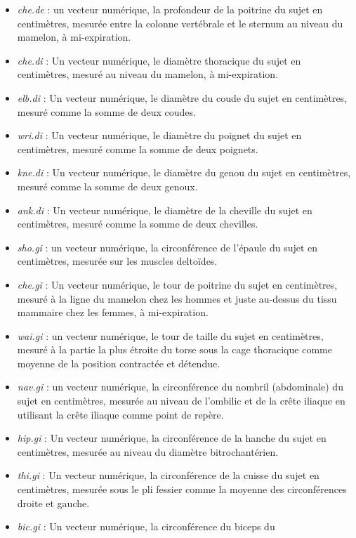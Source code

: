 \documentclass[
]{article}
\providecommand{\tightlist}{%
  \setlength{\itemsep}{0pt}\setlength{\parskip}{0pt}}
\begin{document}
\begin{itemize}
\tightlist
\item
  \emph{che.de} : un vecteur numérique, la profondeur de la poitrine du
  sujet en centimètres, mesurée entre la colonne vertébrale et le
  sternum au niveau du mamelon, à mi-expiration.
\item
  \emph{che.di} : Un vecteur numérique, le diamètre thoracique du sujet
  en centimètres, mesuré au niveau du mamelon, à mi-expiration.
\item
  \emph{elb.di} : Un vecteur numérique, le diamètre du coude du sujet en
  centimètres, mesuré comme la somme de deux coudes.
\item
  \emph{wri.di} : Un vecteur numérique, le diamètre du poignet du sujet
  en centimètres, mesuré comme la somme de deux poignets.
\item
  \emph{kne.di} : Un vecteur numérique, le diamètre du genou du sujet en
  centimètres, mesuré comme la somme de deux genoux.
\item
  \emph{ank.di} : Un vecteur numérique, le diamètre de la cheville du
  sujet en centimètres, mesuré comme la somme de deux chevilles.
\item
  \emph{sho.gi} : un vecteur numérique, la circonférence de l'épaule du
  sujet en centimètres, mesurée sur les muscles deltoïdes.
\item
  \emph{che.gi} : Un vecteur numérique, le tour de poitrine du sujet en
  centimètres, mesuré à la ligne du mamelon chez les hommes et juste
  au-dessus du tissu mammaire chez les femmes, à mi-expiration.
\item
  \emph{wai.gi} : un vecteur numérique, le tour de taille du sujet en
  centimètres, mesuré à la partie la plus étroite du torse sous la cage
  thoracique comme moyenne de la position contractée et détendue.
\item
  \emph{nav.gi} : un vecteur numérique, la circonférence du nombril
  (abdominale) du sujet en centimètres, mesurée au niveau de l'ombilic
  et de la crête iliaque en utilisant la crête iliaque comme point de
  repère.
\item
  \emph{hip.gi} : Un vecteur numérique, la circonférence de la hanche du
  sujet en centimètres, mesurée au niveau du diamètre bitrochantérien.
\item
  \emph{thi.gi} : Un vecteur numérique, la circonférence de la cuisse du
  sujet en centimètres, mesurée sous le pli fessier comme la moyenne des
  circonférences droite et gauche.
\item
  \emph{bic.gi} : Un vecteur numérique, la circonférence du biceps du

\end{itemize}
\end{document}
